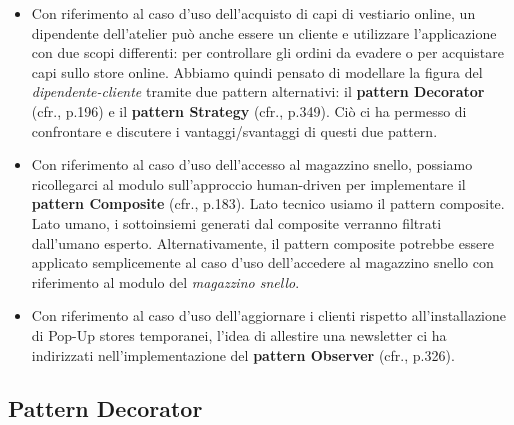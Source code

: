 \documentclass[12pt]{article}
\begin{document}
\begin{itemize}
    \item Con riferimento al caso d'uso dell'acquisto di capi di vestiario online, un dipendente dell'atelier può anche essere un cliente e utilizzare l'applicazione con due scopi differenti: per controllare gli ordini da evadere o per acquistare capi sullo store online.
    Abbiamo quindi pensato di modellare la figura del {\em dipendente-cliente} tramite due pattern alternativi: il \textbf{pattern Decorator} (cfr.\cite{gof_riferimento}, p.196) e il \textbf{pattern Strategy} (cfr.\cite{gof_riferimento}, p.349). Ciò ci ha permesso di confrontare e discutere i vantaggi/svantaggi di questi due pattern.
    \item Con riferimento al caso d'uso dell'accesso al magazzino snello, possiamo ricollegarci al modulo sull'approccio human-driven per implementare il \textbf{pattern Composite} (cfr.\cite{gof_riferimento}, p.183). Lato tecnico usiamo il pattern composite. Lato umano, i sottoinsiemi generati dal composite verranno filtrati dall'umano esperto.
    Alternativamente, il pattern composite potrebbe essere applicato semplicemente al caso d'uso dell'accedere al magazzino snello con riferimento al modulo del {\em magazzino snello}.
    \item Con riferimento al caso d'uso dell'aggiornare i clienti rispetto all'installazione di Pop-Up stores temporanei, l’idea di allestire una newsletter ci ha indirizzati nell'implementazione del \textbf{pattern Observer} (cfr.\cite{gof_riferimento}, p.326).
\end{itemize}


\subsection{Pattern Decorator}
\end{document}
